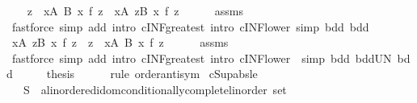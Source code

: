 \begin{isabellebody}
\ \ \isamarkupfalse%
\ {\isachardoublequoteopen}{\isacharparenleft}{\kern0pt}{\isasymSqinter}z\ {\isasymin}\ {\isasymUnion}x{\isasymin}A{\isachardot}{\kern0pt}\ B\ x{\isachardot}{\kern0pt}\ f\ z{\isacharparenright}{\kern0pt}\ {\isasymle}\ {\isacharparenleft}{\kern0pt}{\isasymSqinter}x{\isasymin}A{\isachardot}{\kern0pt}\ {\isasymSqinter}z{\isasymin}B\ x{\isachardot}{\kern0pt}\ f\ z{\isacharparenright}{\kern0pt}{\isachardoublequoteclose}\isanewline
\ \ \ \ \isamarkupfalse%
\ assms\ \isamarkupfalse%
\ {\isacharparenleft}{\kern0pt}fastforce\ simp\ add{\isacharcolon}{\kern0pt}\ intro{\isacharbang}{\kern0pt}{\isacharcolon}{\kern0pt}\ cINF{\isacharunderscore}{\kern0pt}greatest\ intro{\isacharcolon}{\kern0pt}\ cINF{\isacharunderscore}{\kern0pt}lower\ simp{\isacharcolon}{\kern0pt}\ bdd{}\ bdd{\isacharparenright}{\kern0pt}\isanewline
\ \ \isamarkupfalse%
\ \isamarkupfalse%
\ {\isachardoublequoteopen}{\isacharparenleft}{\kern0pt}{\isasymSqinter}x{\isasymin}A{\isachardot}{\kern0pt}\ {\isasymSqinter}z{\isasymin}B\ x{\isachardot}{\kern0pt}\ f\ z{\isacharparenright}{\kern0pt}\ {\isasymle}\ {\isacharparenleft}{\kern0pt}{\isasymSqinter}z\ {\isasymin}\ {\isasymUnion}x{\isasymin}A{\isachardot}{\kern0pt}\ B\ x{\isachardot}{\kern0pt}\ f\ z{\isacharparenright}{\kern0pt}{\isachardoublequoteclose}\isanewline
\ \ \ \ \isamarkupfalse%
\ assms\ \ \isamarkupfalse%
\ {\isacharparenleft}{\kern0pt}fastforce\ simp\ add{\isacharcolon}{\kern0pt}\ intro{\isacharbang}{\kern0pt}{\isacharcolon}{\kern0pt}\ cINF{\isacharunderscore}{\kern0pt}greatest\ intro{\isacharcolon}{\kern0pt}\ cINF{\isacharunderscore}{\kern0pt}lower{}\ \ simp{\isacharcolon}{\kern0pt}\ bdd\ bdd{\isacharunderscore}{\kern0pt}UN\ bdd{}{\isacharparenright}{\kern0pt}\isanewline
\ \ \isamarkupfalse%
\ \isamarkupfalse%
\ {\isacharquery}{\kern0pt}thesis\isanewline
\ \ \ \ \isamarkupfalse%
\ {\isacharparenleft}{\kern0pt}rule\ order{\isacharunderscore}{\kern0pt}antisym{\isacharparenright}{\kern0pt}\isanewline
{}\isamarkupfalse%
%
\endisatagproof
{\isafoldproof}%
%
\isadelimproof
\isanewline
%
\endisadelimproof
\isanewline
{}\isamarkupfalse%
\ cSup{\isacharunderscore}{\kern0pt}abs{\isacharunderscore}{\kern0pt}le{\isacharcolon}{\kern0pt}\isanewline
\ \ \ S\ {\isacharcolon}{\kern0pt}{\isacharcolon}{\kern0pt}\ {\isachardoublequoteopen}{\isacharparenleft}{\kern0pt}{\isacharprime}{\kern0pt}a{\isacharcolon}{\kern0pt}{\isacharcolon}{\kern0pt}{\isacharbraceleft}{\kern0pt}linordered{\isacharunderscore}{\kern0pt}idom{\isacharcomma}{\kern0pt}conditionally{\isacharunderscore}{\kern0pt}complete{\isacharunderscore}{\kern0pt}linorder{\isacharbraceright}{\kern0pt}{\isacharparenright}{\kern0pt}\ set{\isachardoublequoteclose}\isanewline

\end{isabellebody}
